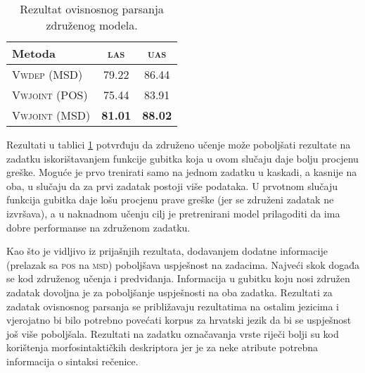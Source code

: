 \begin{table}
\centering
\caption{Rezultat ovisnosnog parsanja združenog modela.}
\label{table:depparsing:joint}
\begin{tabular}{|l|c|c|}
\hline
Metoda                 & \textsc{las}   & \textsc{uas}    \\ \hline \hline
\textsc{Vwdep}   (MSD) & 79.22          & 86.44           \\
\textsc{Vwjoint} (POS) & 75.44          & 83.91           \\
\textsc{Vwjoint} (MSD) & \textbf{81.01} & \textbf{88.02}  \\ \hline
\end{tabular}
\end{table}

Rezultati u tablici \ref{table:depparsing:joint} potvrđuju da združeno učenje
može poboljšati rezultate na zadatku iskorištavanjem funkcije gubitka koja u
ovom slučaju daje bolju procjenu greške. Moguće je prvo trenirati samo na jednom
zadatku u kaskadi, a kasnije na oba, u slučaju da za prvi zadatak postoji više
podataka. U prvotnom slučaju funkcija gubitka daje lošu procjenu prave greške
(jer se združeni zadatak ne izvršava), a u naknadnom učenju cilj je pretrenirani
model prilagoditi da ima dobre performanse na združenom zadatku.

Kao što je vidljivo iz prijašnjih rezultata, dodavanjem dodatne informacije
(prelazak sa \textsc{pos} na \textsc{msd}) poboljšava uspješnost na zadacima.
Najveći skok događa se kod združenog učenja i predviđanja. Informacija u gubitku
koju nosi združen zadatak dovoljna je za poboljšanje uspješnosti na oba zadatka.
Rezultati za zadatak ovisnosnog parsanja se približavaju rezultatima na ostalim
jezicima i vjerojatno bi bilo potrebno povećati korpus za hrvatski jezik da bi
se uspješnost još više poboljšala. Rezultati na zadatku označavanja vrste riječi
bolji su kod korištenja morfosintaktičkih deskriptora jer je za neke atribute
potrebna informacija o sintaksi rečenice.

